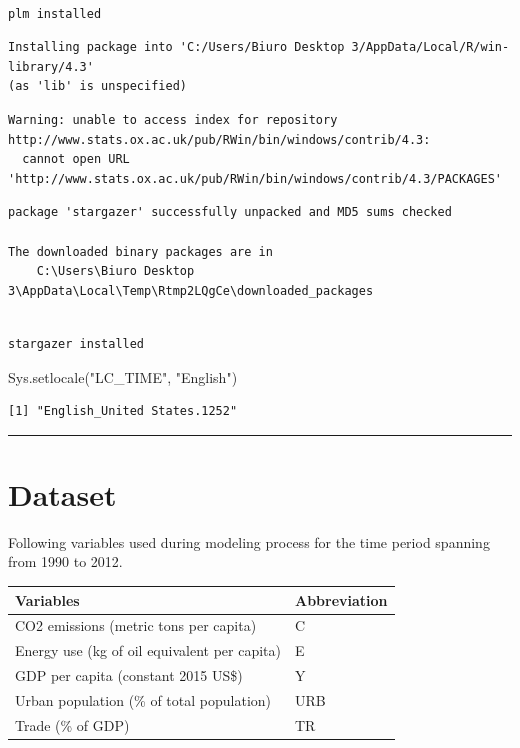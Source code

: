 \documentclass[
  11pt,
]{article}
\newenvironment{Shaded}{\begin{snugshade}}{\end{snugshade}}
\newcommand{\FunctionTok}[1]{\textcolor[rgb]{0.28,0.35,0.67}{#1}}
\newcommand{\NormalTok}[1]{\textcolor[rgb]{0.00,0.23,0.31}{#1}}
\newcommand{\StringTok}[1]{\textcolor[rgb]{0.13,0.47,0.30}{#1}}
\begin{document}
\begin{verbatim}

plm installed
\end{verbatim}

\begin{verbatim}
Installing package into 'C:/Users/Biuro Desktop 3/AppData/Local/R/win-library/4.3'
(as 'lib' is unspecified)
\end{verbatim}

\begin{verbatim}
Warning: unable to access index for repository http://www.stats.ox.ac.uk/pub/RWin/bin/windows/contrib/4.3:
  cannot open URL 'http://www.stats.ox.ac.uk/pub/RWin/bin/windows/contrib/4.3/PACKAGES'
\end{verbatim}

\begin{verbatim}
package 'stargazer' successfully unpacked and MD5 sums checked

The downloaded binary packages are in
    C:\Users\Biuro Desktop 3\AppData\Local\Temp\Rtmp2LQgCe\downloaded_packages
\end{verbatim}

\begin{verbatim}

stargazer installed
\end{verbatim}

\begin{Shaded}
\begin{Highlighting}[]
\FunctionTok{Sys.setlocale}\NormalTok{(}\StringTok{"LC\_TIME"}\NormalTok{, }\StringTok{"English"}\NormalTok{)}
\end{Highlighting}
\end{Shaded}

\begin{verbatim}
[1] "English_United States.1252"
\end{verbatim}

\begin{center}\rule{0.5\linewidth}{0.5pt}\end{center}

\hypertarget{dataset}{%
\section{Dataset}\label{dataset}}

Following variables used during modeling process for the time period
spanning from 1990 to 2012.

\begin{longtable}[]{@{}ll@{}}
\toprule\noalign{}
Variables & Abbreviation \\
\midrule\noalign{}
\endhead
\bottomrule\noalign{}
\endlastfoot
CO2 emissions (metric tons per capita) & C \\
Energy use (kg of oil equivalent per capita) & E \\
GDP per capita (constant 2015 US\$) & Y \\
Urban population (\% of total population) & URB \\
Trade (\% of GDP) & TR \\
\end{longtable}
\end{document}
